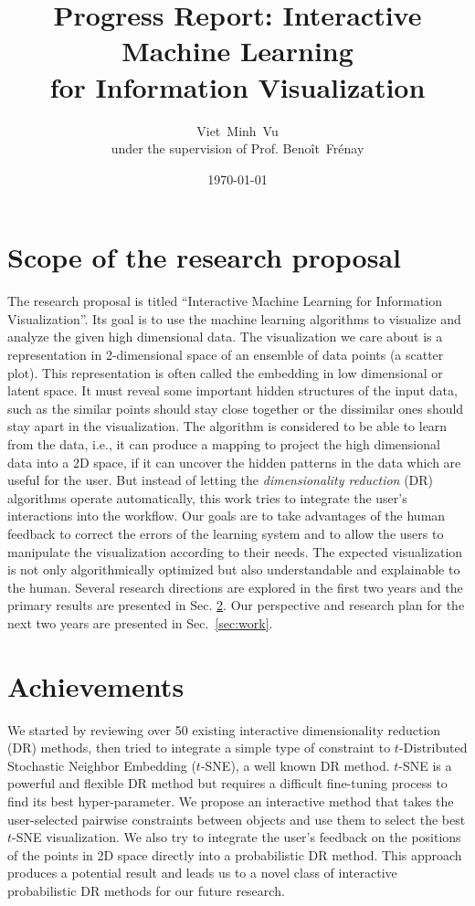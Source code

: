 \documentclass[11pt, a4paper]{article}
\title{Progress Report: Interactive Machine Learning\\ for Information Visualization}
\author{Viet~Minh~Vu\\ under the supervision of Prof. Beno\^it~Fr\'enay}
\date{\today}
\begin{document}
 
\maketitle

\section{Scope of the research proposal}
The research proposal is titled ``Interactive Machine Learning for Information Visualization''.
Its goal is to use the machine learning algorithms to visualize and analyze the given high dimensional data.
The visualization we care about is a representation in 2-dimensional space of an ensemble of data points (a scatter plot).
This representation is often called the embedding in low dimensional or latent space.
It must reveal some important hidden structures of the input data, such as the similar points should stay close together or the dissimilar ones should stay apart in the visualization.
The algorithm is considered to be able to learn from the data, i.e., it can produce a mapping to project the high dimensional data into a 2D space, if it can uncover the hidden patterns in the data which are useful for the user.
But instead of letting the \emph{dimensionality reduction} (DR) algorithms operate automatically, this work tries to integrate the user's interactions into the workflow.
Our goals are to take advantages of the human feedback to correct the errors of the learning system and to allow the users to manipulate the visualization according to their needs.
The expected visualization is not only algorithmically optimized but also understandable and explainable to the human.
Several research directions are explored in the first two years and the primary results are presented in Sec. \ref{sec:results}. Our perspective and research plan for the next two years are presented in Sec.~\ref{sec:work}.


\section{Achievements}\label{sec:results}
We started by reviewing over 50 existing interactive dimensionality reduction (DR) methods, then tried to integrate a simple type of constraint to $t$-Distributed Stochastic Neighbor Embedding ($t$-SNE), a well known DR method.
$t$-SNE is a powerful and flexible DR method but requires a difficult fine-tuning process to find its best hyper-parameter. 
We propose an interactive method that takes the user-selected pairwise constraints between objects and use them to select the best $t$-SNE visualization.
We also try to integrate the user's feedback on the positions of the points in 2D space directly into a probabilistic DR method.
This approach produces a potential result and leads us to a novel class of interactive probabilistic DR methods for our future research.
 
\end{document}
